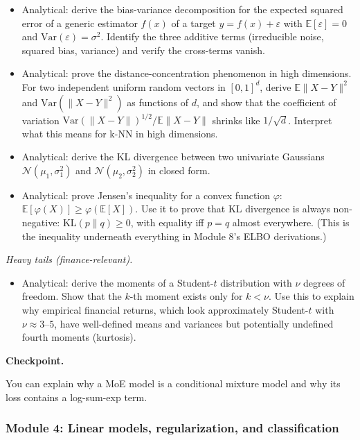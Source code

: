 \begin{itemize}
\tightlist
\item
  Analytical: derive the bias-variance decomposition for the expected
  squared error of a generic estimator \(\hat{f}(x)\) of a target
  \(y = f(x) + \varepsilon\) with \(\mathbb{E}[\varepsilon] = 0\) and
  \(\text{Var}(\varepsilon) = \sigma^2\). Identify the three additive
  terms (irreducible noise, squared bias, variance) and verify the
  cross-terms vanish.
\item
  Analytical: prove the distance-concentration phenomenon in high
  dimensions. For two independent uniform random vectors in \([0,1]^d\),
  derive \(\mathbb{E}\|X - Y\|^2\) and \(\text{Var}(\|X - Y\|^2)\) as
  functions of \(d\), and show that the coefficient of variation
  \(\text{Var}(\|X - Y\|)^{1/2} / \mathbb{E}\|X - Y\|\) shrinks like
  \(1/\sqrt{d}\). Interpret what this means for k-NN in high dimensions.
\item
  Analytical: derive the KL divergence between two univariate Gaussians
  \(\mathcal{N}(\mu_1, \sigma_1^2)\) and
  \(\mathcal{N}(\mu_2, \sigma_2^2)\) in closed form.
\item
  Analytical: prove Jensen's inequality for a convex function
  \(\varphi\): \(\mathbb{E}[\varphi(X)] \geq \varphi(\mathbb{E}[X])\).
  Use it to prove that KL divergence is always non-negative:
  \(\text{KL}(p \| q) \geq 0\), with equality iff \(p = q\) almost
  everywhere. (This is the inequality underneath everything in Module
  8's ELBO derivations.)
\end{itemize}

\emph{Heavy tails (finance-relevant).}

\begin{itemize}
\tightlist
\item
  Analytical: derive the moments of a Student-\(t\) distribution with
  \(\nu\) degrees of freedom. Show that the \(k\)-th moment exists only
  for \(k < \nu\). Use this to explain why empirical financial returns,
  which look approximately Student-\(t\) with \(\nu \approx 3\)--\(5\),
  have well-defined means and variances but potentially undefined fourth
  moments (kurtosis).
\end{itemize}

\textbf{Checkpoint.}

You can explain why a MoE model is a conditional mixture model and why
its loss contains a log-sum-exp term.

\subsubsection{Module 4: Linear models, regularization, and
classification}\label{module-4-linear-models-regularization-and-classification}

